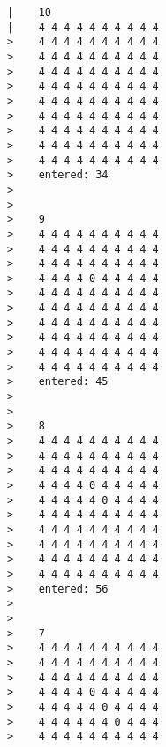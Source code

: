\documentclass[12pt]{book}
\begin{document}
\begin{lstlisting}
                               |    10 
                               |    4 4 4 4 4 4 4 4 4 4 
                               >    4 4 4 4 4 4 4 4 4 4 
                               >    4 4 4 4 4 4 4 4 4 4 
                               >    4 4 4 4 4 4 4 4 4 4 
                               >    4 4 4 4 4 4 4 4 4 4 
                               >    4 4 4 4 4 4 4 4 4 4 
                               >    4 4 4 4 4 4 4 4 4 4 
                               >    4 4 4 4 4 4 4 4 4 4 
                               >    4 4 4 4 4 4 4 4 4 4 
                               >    4 4 4 4 4 4 4 4 4 4 
                               >    entered: 34
                               >
                               >
                               >    9 
                               >    4 4 4 4 4 4 4 4 4 4 
                               >    4 4 4 4 4 4 4 4 4 4 
                               >    4 4 4 4 4 4 4 4 4 4 
                               >    4 4 4 4 0 4 4 4 4 4 
                               >    4 4 4 4 4 4 4 4 4 4 
                               >    4 4 4 4 4 4 4 4 4 4 
                               >    4 4 4 4 4 4 4 4 4 4 
                               >    4 4 4 4 4 4 4 4 4 4 
                               >    4 4 4 4 4 4 4 4 4 4 
                               >    4 4 4 4 4 4 4 4 4 4 
                               >    entered: 45
                               >
                               >
                               >    8 
                               >    4 4 4 4 4 4 4 4 4 4 
                               >    4 4 4 4 4 4 4 4 4 4 
                               >    4 4 4 4 4 4 4 4 4 4 
                               >    4 4 4 4 0 4 4 4 4 4 
                               >    4 4 4 4 4 0 4 4 4 4 
                               >    4 4 4 4 4 4 4 4 4 4 
                               >    4 4 4 4 4 4 4 4 4 4 
                               >    4 4 4 4 4 4 4 4 4 4 
                               >    4 4 4 4 4 4 4 4 4 4 
                               >    4 4 4 4 4 4 4 4 4 4 
                               >    entered: 56
                               >
                               >
                               >    7 
                               >    4 4 4 4 4 4 4 4 4 4 
                               >    4 4 4 4 4 4 4 4 4 4 
                               >    4 4 4 4 4 4 4 4 4 4 
                               >    4 4 4 4 0 4 4 4 4 4 
                               >    4 4 4 4 4 0 4 4 4 4 
                               >    4 4 4 4 4 4 0 4 4 4 
                               >    4 4 4 4 4 4 4 4 4 4 

\end{lstlisting}
\end{document}
